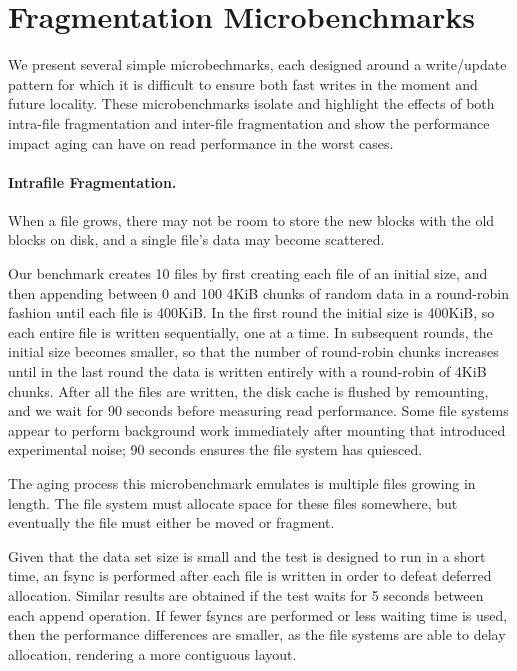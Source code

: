 \section{Fragmentation Microbenchmarks}\label{sec:fsa-microbenchmarks}

We present several simple microbechmarks, each designed around a write/update
pattern for which it is difficult to ensure both fast writes in the moment and
future locality.  These microbenchmarks isolate and highlight the effects of
both intra-file fragmentation and inter-file fragmentation and show the
performance impact aging can have on read performance in the worst cases.

\paragraph{Intrafile Fragmentation.} When a file grows, there may not be room
to store the new blocks with the old blocks on disk, and a single file's data
may become scattered.  

Our benchmark creates 10 files by first creating each file of an initial size,
and then appending between 0 and 100 4KiB chunks of random data in a
round-robin fashion until each file is 400KiB.  In the first round the initial
size is 400KiB, so each entire file is written sequentially, one at a time. In
subsequent rounds, the initial size becomes smaller, so that the number of
round-robin chunks increases until in the last round the data is written
entirely with a round-robin of 4KiB chunks. After all the files are written,
the disk cache is flushed by remounting, and we wait for 90 seconds before
measuring read performance.  Some file systems appear to perform background
work immediately after mounting that introduced experimental noise; 90 seconds
ensures the file system has quiesced.

The aging process this microbenchmark emulates is multiple files growing in
length. The file system must allocate space for these files somewhere, but
eventually the file must either be moved or fragment. 

Given that the data set size is small and the test is designed to run in a
short time, an fsync is performed after each file is written in order to defeat
deferred allocation. Similar results are obtained if the test waits for 5
seconds between each append operation. If fewer fsyncs are performed or less
waiting time is used, then the performance differences are smaller, as the file
systems are able to delay allocation, rendering a more contiguous layout.

